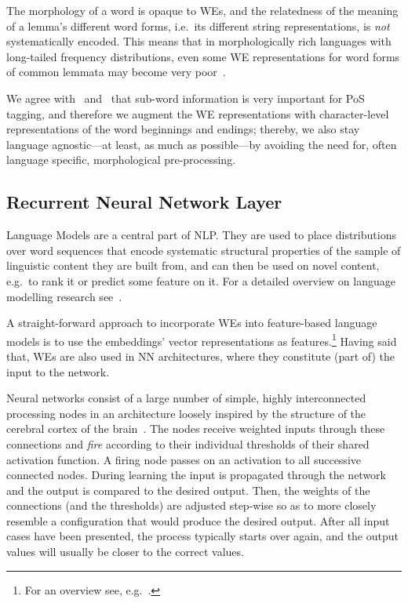 \documentclass[11pt]{article}
\begin{document}
The morphology of a word is opaque to WEs, and the relatedness of
the meaning of a lemma's different word forms, i.e.~its different string
representations, is \emph{not} systematically encoded. 
This means that in morphologically rich languages with long-tailed frequency
distributions, even some WE representations for word forms of common
lemmata may become very poor~\cite{DBLP:journals/corr/KimJSR15}.

We agree with~
and~ that sub-word information is very
important for PoS tagging, and therefore we augment the WE representations with
character-level representations of the word beginnings and endings; thereby, we
also stay language agnostic---at least, as much as possible---by avoiding the
need for, often language specific, morphological pre-processing.


\subsection{Recurrent Neural Network Layer} %

Language Models are a central part of NLP.
They are used to place distributions over word sequences that encode systematic
structural properties of the sample of linguistic content they are built from,
and can then be used on novel content, e.g.~to rank it or predict some feature
on it. 
For a detailed overview on language modelling research see~.

A straight-forward approach to incorporate WEs into feature-based
language models is to use the embeddings' vector representations as
features.\footnote{For an overview see,
e.g.~.}
Having said that, WEs are also used in NN architectures, where they constitute
(part of) the input to the network. 

Neural networks consist of a large number of simple, highly interconnected
processing nodes in an architecture loosely inspired by the structure of the
cerebral cortex of the brain~\cite{oreilly2000}.
The nodes receive weighted inputs through these connections and \emph{fire}
according to their individual thresholds of their shared activation function.
A firing node passes on an activation to all successive connected nodes.
During learning the input is propagated through the network and the output is
compared to the desired output. 
Then, the weights of the connections (and the thresholds) are adjusted
step-wise so as to more closely resemble a configuration that would produce the
desired output.
After all input cases have been presented, the process typically starts over
again, and the output values will usually be closer to the correct values.
\end{document}
